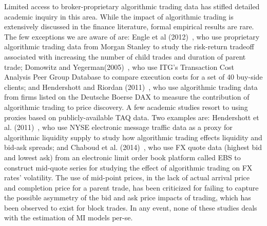 Limited access to broker-proprietary algorithmic trading data has stifled detailed academic inquiry in this area. While the impact of algorithmic trading is extensively discussed in the finance literature, formal empirical results are rare. The few exceptions we are aware of are: Engle et al (2012)~\cite{engle2012}, who use proprietary algorithmic trading data from Morgan Stanley to study the risk-return tradeoff associated with increasing the number of child trades and duration of parent trade; Domowitz and Yegerman(2005)~\cite{doye}, who use ITG's Transaction Cost Analysis Peer Group Database to compare execution costs for a set of 40 buy-side clients; and Hendershott and Riordan (2011)~\cite{hernderrio}, who use algorithmic trading data from firms listed on the Deutsche Boerse DAX to measure the contribution of algorithmic trading to price discovery. A few academic studies resort to using proxies based on publicly-available TAQ data. Two examples are: Hendershott et al. (2011)~\cite{hender2011}, who use NYSE electronic message traffic data as a proxy for algorithmic liquidity supply to study how algorithmic trading effects liquidity and bid-ask spreads; and Chaboud et al. (2014)~\cite{chaboud}, who use FX quote data (highest bid and lowest ask) from an electronic limit order book platform called EBS to construct mid-quote series for studying the effect of algorithmic trading on FX rates' volatility. The use of mid-point prices, in the lack of actual arrival price and completion price for a parent trade, has been criticized for failing to capture the possible asymmetry of the bid and ask price impacts of trading, which has been observed to exist for block trades. In any event, none of these studies deals with the estimation of MI models per-se.


